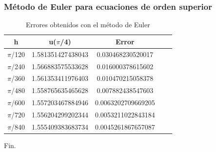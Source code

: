 \documentclass{beamer}
\begin{document}
\begin{frame}
	\frametitle{Método de Euler para ecuaciones de orden superior}

    \begin{table}[H]
        \centering
        \setlength\extrarowheight{3pt}
        
        \begin{tabular}{|c|c|c|c|c}
            \hline
            \textbf{h} & {\textbf{u($\pi$/4)}} & \textbf{Error} \\ 
            \hline
                $\pi$/120 & 1.581351427438043 & 0.030468230520017\\
            \hline
                $\pi$/240 & 1.566883575533628 & 0.016000378615602\\
            \hline
                $\pi$/360 & 1.561353411976403 & 0.010470215058378\\
            \hline
                $\pi$/480 & 1.558765635465628 & 0.007882438547603\\
            \hline
                $\pi$/600 & 1.557203467884946 & 0.0063202709669205\\
            \hline
                $\pi$/720 &  1.556204299202344 & 0.0053211022843184\\
            \hline
                $\pi$/840 & 1.555409383683734 & 0.0045261867657087\\
            \hline
        \end{tabular}
        
        \caption{Errores obtenidos con el método de Euler}           
    \end{table}

\end{frame}

\begin{frame}
\Huge{\centerline{Fin.}}
\end{frame}

\end{document}

